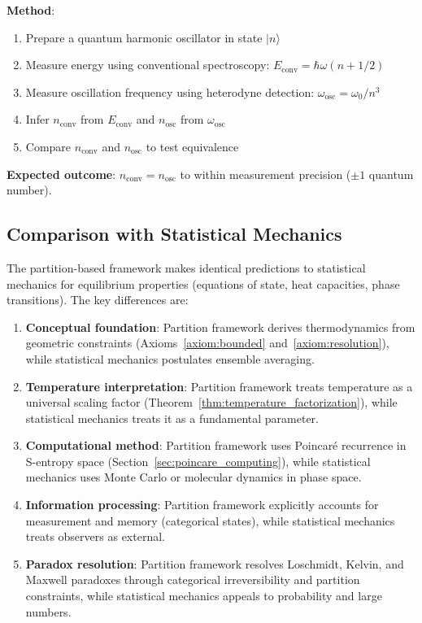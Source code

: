 \textbf{Method}:
\begin{enumerate}
    \item Prepare a quantum harmonic oscillator in state $|n\rangle$
    \item Measure energy using conventional spectroscopy: $E_{\text{conv}} = \hbar\omega(n + 1/2)$
    \item Measure oscillation frequency using heterodyne detection: $\omega_{\text{osc}} = \omega_0/n^3$
    \item Infer $n_{\text{conv}}$ from $E_{\text{conv}}$ and $n_{\text{osc}}$ from $\omega_{\text{osc}}$
    \item Compare $n_{\text{conv}}$ and $n_{\text{osc}}$ to test equivalence
\end{enumerate}

\textbf{Expected outcome}: $n_{\text{conv}} = n_{\text{osc}}$ to within measurement precision ($\pm 1$ quantum number).

\subsection{Comparison with Statistical Mechanics}

The partition-based framework makes identical predictions to statistical mechanics for equilibrium properties (equations of state, heat capacities, phase transitions). The key differences are:

\begin{enumerate}
    \item \textbf{Conceptual foundation}: Partition framework derives thermodynamics from geometric constraints (Axioms~\ref{axiom:bounded} and~\ref{axiom:resolution}), while statistical mechanics postulates ensemble averaging.
    
    \item \textbf{Temperature interpretation}: Partition framework treats temperature as a universal scaling factor (Theorem~\ref{thm:temperature_factorization}), while statistical mechanics treats it as a fundamental parameter.
    
    \item \textbf{Computational method}: Partition framework uses Poincaré recurrence in S-entropy space (Section~\ref{sec:poincare_computing}), while statistical mechanics uses Monte Carlo or molecular dynamics in phase space.
    
    \item \textbf{Information processing}: Partition framework explicitly accounts for measurement and memory (categorical states), while statistical mechanics treats observers as external.
    
    \item \textbf{Paradox resolution}: Partition framework resolves Loschmidt, Kelvin, and Maxwell paradoxes through categorical irreversibility and partition constraints, while statistical mechanics appeals to probability and large numbers.
\end{enumerate}

